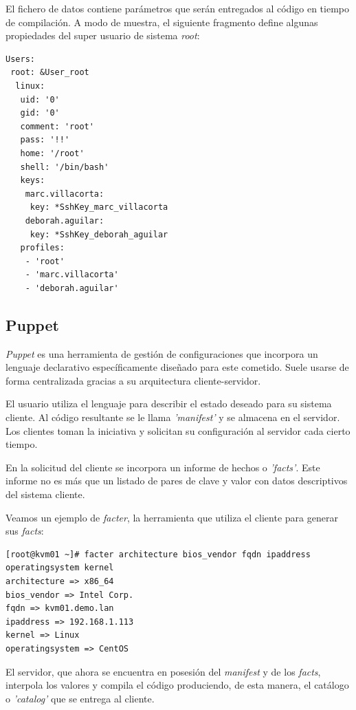 \documentclass[a4paper,12pt,spanish,final]{epsc_tfc_pfc}
\begin{document}
El fichero de datos contiene parámetros que serán entregados al código en tiempo de compilación. A modo de muestra, el siguiente fragmento define algunas propiedades del super usuario de sistema \emph{root}:\\

\begin{lstlisting}[style=dnsmasq]
Users:
 root: &User_root
  linux:
   uid: '0'
   gid: '0'
   comment: 'root'
   pass: '!!'
   home: '/root'
   shell: '/bin/bash'
   keys:
    marc.villacorta:
     key: *SshKey_marc_villacorta
    deborah.aguilar:
     key: *SshKey_deborah_aguilar
   profiles:
    - 'root'
    - 'marc.villacorta'
    - 'deborah.aguilar'
\end{lstlisting}

\subsection{Puppet}

\emph{Puppet} es una herramienta de gestión de configuraciones que incorpora un lenguaje declarativo específicamente diseñado para este cometido. Suele usarse de forma centralizada gracias a su arquitectura cliente-servidor.

El usuario utiliza el lenguaje para describir el estado deseado para su sistema cliente. Al código resultante se le llama \emph{'manifest'} y se almacena en el servidor. Los clientes toman la iniciativa y solicitan su configuración al servidor cada cierto tiempo.

En la solicitud del cliente se incorpora un informe de hechos o \emph{'facts'}. Este informe no es más que un listado de pares de clave y valor con datos descriptivos del sistema cliente.

Veamos un ejemplo de \emph{facter}, la herramienta que utiliza el cliente para generar sus \emph{facts}:\\

\begin{lstlisting}[style=dnsmasq]
[root@kvm01 ~]# facter architecture bios_vendor fqdn ipaddress operatingsystem kernel
architecture => x86_64
bios_vendor => Intel Corp.
fqdn => kvm01.demo.lan
ipaddress => 192.168.1.113
kernel => Linux
operatingsystem => CentOS
\end{lstlisting}

El servidor, que ahora se encuentra en posesión del \emph{manifest} y de los \emph{facts}, interpola los valores y compila el código produciendo, de esta manera, el catálogo o \emph{'catalog'} que se entrega al cliente.
\end{document}
